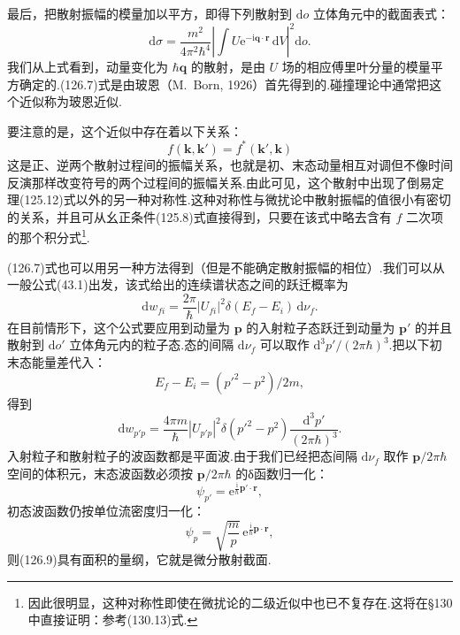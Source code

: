 最后，把散射振幅的模量加以平方，即得下列散射到 $\mathrm{d}o$ 立体角元中的截面表式：
\begin{equation}
  \mathrm{d}\sigma=\frac{m^2}{4\pi^2\hbar^4}
  \left|\int U\mathrm{e}^{-\mathrm{i}\boldsymbol{q}\cdot\boldsymbol{r}}\,
  \mathrm{d}V\right|^2\mathrm{d}o.
\end{equation}
我们从上式看到，动量变化为 $\hbar\boldsymbol{q}$ 的散射，是由 $U$ 场的相应傅里叶分量的模量平方确定的.(126.7)式是由玻恩（M.~Born, 1926）首先得到的.碰撞理论中通常把这个近似称为玻恩近似.

要注意的是，这个近似中存在着以下关系：
\begin{equation}
  f(\boldsymbol{k},\boldsymbol{k}')
  =f^{*}(\boldsymbol{k}',\boldsymbol{k})
\end{equation}
这是正、逆两个散射过程间的振幅关系，也就是初、末态动量相互对调但不像时间反演那样改变符号的两个过程间的振幅关系.由此可见，这个散射中出现了倒易定理(125.12)式以外的另一种对称性.这种对称性与微扰论中散射振幅的值很小有密切的关系，并且可从幺正条件(125.8)式直接得到，只要在该式中略去含有 $f$ 二次项的那个积分式\footnote{因此很明显，这种对称性即使在微扰论的二级近似中也已不复存在.这将在§130中直接证明：参考(130.13)式.}.

(126.7)式也可以用另一种方法得到（但是不能确定散射振幅的相位）.我们可以从一般公式(43.1)出发，该式给出的连续谱状态之间的跃迁概率为
\begin{equation*}
  \mathrm{d}w_{fi}=\frac{2\pi}{\hbar}|U_{fi}|^2
  \delta(E_f-E_i)\,\mathrm{d}\nu_f.
\end{equation*}
在目前情形下，这个公式要应用到动量为 $\boldsymbol{p}$ 的入射粒子态跃迁到动量为 $\boldsymbol{p}'$ 的并且散射到 $\mathrm{d}o'$ 立体角元内的粒子态.态的间隔 $\mathrm{d}\nu_f$ 可以取作 $\mathrm{d}^3p'/(2\pi\hbar)^3$.把以下初末态能量差代入：
\begin{equation*}
  E_f-E_i=(p'^2-p^2)/2m,
\end{equation*}
得到
\begin{equation}
  \mathrm{d}w_{p'p}=\frac{4\pi m}{\hbar}|U_{p'p}|^2
  \delta(p'^2-p^2)\frac{\mathrm{d}^3p'}{(2\pi\hbar)^3}.
\end{equation}
入射粒子和散射粒子的波函数都是平面波.由于我们已经把态间隔 $\mathrm{d}\nu_f$ 取作 $\boldsymbol{p}/2\pi\hbar$ 空间的体积元，末态波函数必须按 $\boldsymbol{p}/2\pi\hbar$ 的δ函数归一化：
\begin{equation}
  \psi_{p'}=\mathrm{e}^{\frac{\mathrm{i}}{\hbar}\boldsymbol{p}'\cdot\boldsymbol{r}},
\end{equation}
初态波函数仍按单位流密度归一化：
\begin{equation}
  \psi_p=\sqrt{\frac{m}{p}}\,
  \mathrm{e}^{\frac{\mathrm{i}}{\hbar}\boldsymbol{p}\cdot\boldsymbol{r}},
\end{equation}
则(126.9)具有面积的量纲，它就是微分散射截面.

